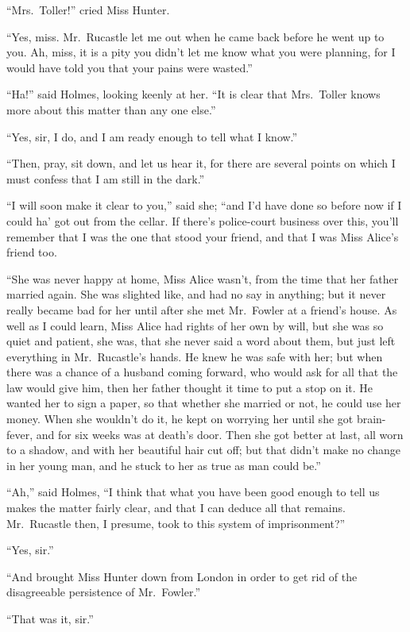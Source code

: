 “Mrs.~Toller!” cried Miss Hunter.

“Yes, miss. Mr.~Rucastle let me out when he came back
before he went up to you. Ah, miss, it is a pity you didn’t let
me know what you were planning, for I would have told you
that your pains were wasted.”

“Ha!” said Holmes, looking keenly at her. “It is clear
that Mrs.~Toller knows more about this matter than any one
else.”

“Yes, sir, I do, and I am ready enough to tell what I
know.”

“Then, pray, sit down, and let us hear it, for there are
several points on which I must confess that I am still in the
dark.”

“I will soon make it clear to you,” said she; “and I’d have
done so before now if I could ha’ got out from the cellar. If
there’s police-court business over this, you’ll remember that I
was the one that stood your friend, and that I was Miss Alice’s
friend too.

“She was never happy at home, Miss Alice wasn’t, from the
time that her father married again. She was slighted like, and
had no say in anything; but it never really became bad for
her until after she met Mr.~Fowler at a friend’s house. As
well as I could learn, Miss Alice had rights of her own by will,
but she was so quiet and patient, she was, that she never said
a word about them, but just left everything in Mr.~Rucastle’s
hands. He knew he was safe with her; but when there was a
chance of a husband coming forward, who would ask for all that
the law would give him, then her father thought it time to put a
stop on it. He wanted her to sign a paper, so that whether she
married or not, he could use her money. When she wouldn’t
do it, he kept on worrying her until she got brain-fever, and
for six weeks was at death’s door. Then she got better at
last, all worn to a shadow, and with her beautiful hair cut off;
but that didn’t make no change in her young man, and he
stuck to her as true as man could be.”

“Ah,” said Holmes, “I think that what you have been
good enough to tell us makes the matter fairly clear, and that
I can deduce all that remains. Mr.~Rucastle then, I presume,
took to this system of imprisonment?”

“Yes, sir.”

“And brought Miss Hunter down from London in order to
get rid of the disagreeable persistence of Mr.~Fowler.”

“That was it, sir.”

